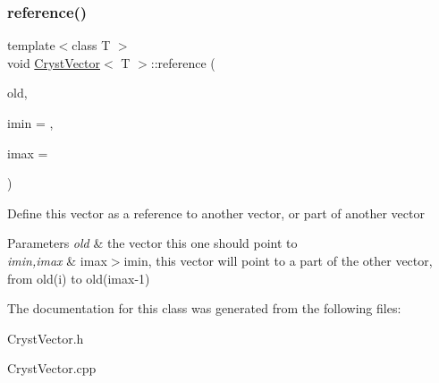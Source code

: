 \subsubsection{\texorpdfstring{reference()}{reference()}}
{\footnotesize\ttfamily template$<$class T $>$ \\
void \mbox{\hyperlink{class_cryst_vector}{Cryst\+Vector}}$<$ T $>$\+::reference (\begin{DoxyParamCaption}\item[{\mbox{\hyperlink{class_cryst_vector}{Cryst\+Vector}}$<$ T $>$ \&}]{old,  }\item[{const long}]{imin = {},  }\item[{const long}]{imax = {} }\end{DoxyParamCaption})}

Define this vector as a reference to another vector, or part of another vector


\begin{DoxyParams}{Parameters}
{\em old} & the vector this one should point to \\
\hline
{\em imin,imax} & imax$>$imin, this vector will point to a part of the other vector, from old(i) to old(imax-\/1) \\
\hline
\end{DoxyParams}


The documentation for this class was generated from the following files\+:\begin{DoxyCompactItemize}
\item 
Cryst\+Vector.\+h\item 
Cryst\+Vector.\+cpp\end{DoxyCompactItemize}
